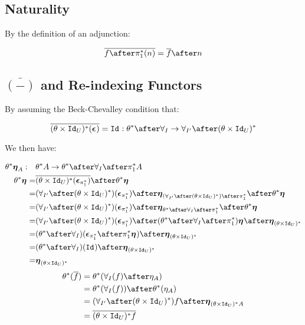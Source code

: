     \subsection{Naturality}
    By the definition of an adjunction:
    
    \begin{equation}
        \bar{f\after\pstar(n)} = \bar{f}\after n
    \end{equation}
    
    \subsection{$\bar{(-)}$ and Re-indexing Functors}
    By assuming the Beck-Chevalley condition that:
    
    \begin{equation}
        \bar{(\theta\times\Id{U})\star(\counit{})} = \Id{}: \theta\star\after\allI \rightarrow \allII\after(\theta\times\Id{U})\star
    \end{equation}
    
    We then have:
    
    \begin{align*}
        \theta\star\unit{A}:\quad&\theta\star A \rightarrow \theta\star\after\allI\after\pstar A\\
        \theta\star\unit{} =& \bar{(\theta\times\Id{U})\star(\counit{\pstar})}\after\theta\star\unit{}\\
        =& (\allII\after(\theta\times\Id{U})\star)(\counit{\pstar})\after\unit{(\allII\after(\theta\times\Id{U})\star)\after\pstar}\after\theta\star\unit{}\\
        = & (\allII\after(\theta\times\Id{U})\star)(\counit{\pstar})\after\unit{\theta\star\after\allI\after\pstar}\after\theta\star\unit{}\\
        = & (\allII\after(\theta\times\Id{U})\star)(\counit{\pstar}) \after(\theta\star\after\allI\after\pstar)\unit{} \after\unit{(\theta\times\Id{U})\star}\\
        = & (\theta\star\after\allI)(\counit{\pstar}
        \after\pstar\unit{})\after\unit{(\theta\times\Id{U})\star}\\
        = & (\theta\star\after\allI)(\Id{})\after\unit{(\theta\times\Id{U})\star}\\
        = & \unit{(\theta\times\Id{U})\star}
    \end{align*}
    \begin{align*}
        \theta\star(\bar{f}) & = \theta\star(\allI(f)\after\eta_A)\\
        & = \theta\star(\allI(f))\after\theta\star(\eta_A)\\
        & =  (\allII\after(\theta\times\Id{U})\star)f \after\unit{(\theta\times\Id{U})\star A}\\
        & = \bar{(\theta\times\Id{U})\star f}\\
    \end{align*}
    
